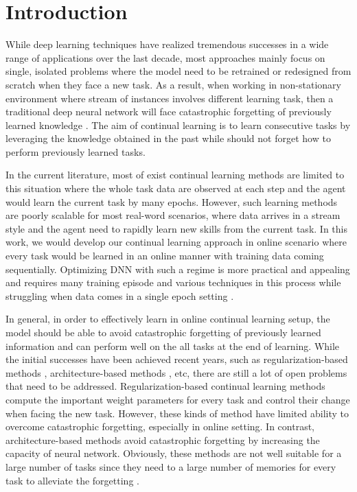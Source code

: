 \documentclass[review]{elsarticle}
\begin{document}
\section{Introduction}%

While deep learning techniques have realized tremendous successes in a wide range of applications over the last decade, most approaches mainly focus on single, isolated problems where the model need to be retrained or redesigned from scratch when they face a new task. As a result, when working in non-stationary environment where stream of instances involves different learning task, then a traditional deep neural network will face catastrophic forgetting of previously learned knowledge \cite{1french2006catastrophic}. The aim of continual learning is to learn consecutive tasks by leveraging the knowledge obtained in the past while should not forget how to perform previously learned tasks. 

In the current literature, most of exist continual learning methods are limited to this situation where the whole task data are observed at each step and the agent would learn the current task by many epochs. However, such learning methods are poorly scalable for most real-word scenarios, where data arrives in a stream style and the agent need to rapidly learn new skills from the current task. In this work, we would develop our continual learning approach in online scenario where every task would be learned in an online manner with training data coming sequentially. Optimizing DNN with such a regime is more practical and appealing and requires many training episode and various techniques in this process while struggling when data comes in a single epoch setting \cite{2sahoo2018online,3pham2019bilevel}.

In general, in order to effectively learn in online continual learning setup, the model should be able to avoid catastrophic forgetting of previously learned information and can perform well on the all tasks at the end of learning. While the initial successes have been achieved recent years, such as regularization-based methods \cite{4kirkpatrick2017overcoming,5zenke2017continual,6leibe2016computer}, architecture-based methods \cite{7yoon2018lifelong,8rusu2016progressive}, etc, there are still a lot of open problems that need to be addressed. Regularization-based continual learning methods compute the important weight parameters for every task and control their change when facing the new task. However, these kinds of method have limited ability to overcome catastrophic forgetting, especially in online setting. In contrast, architecture-based methods avoid catastrophic forgetting by increasing the capacity of neural network. Obviously, these methods are not well suitable for a large number of tasks since they need to a large number of memories for every task to alleviate the forgetting \cite{9parisi2019continual}. 
\end{document}
